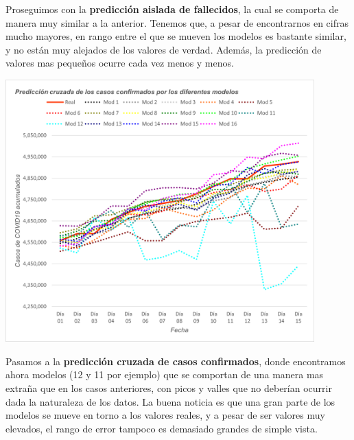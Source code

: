 \documentclass[12pt,a4paper, xcolor=table]{article}
\begin{document}
            Proseguimos con la \textbf{predicción aislada de fallecidos}, la cual se comporta de manera muy similar a la anterior. Tenemos que, a pesar de encontrarnos en cifras mucho mayores, en rango entre el que se mueven los modelos es bastante similar, y no están muy alejados de los valores de verdad. Además, la predicción de valores mas pequeños ocurre cada vez menos y menos. 
        
            \begin{center}
                \centering
                \includegraphics[width=450px]{img/pred_c_conf_BZ.png}
            \end{center}
            
            Pasamos a la \textbf{predicción cruzada de casos confirmados}, donde encontramos ahora modelos (12 y 11 por ejemplo) que se comportan de una manera mas extraña que en los casos anteriores, con picos y valles que no deberían ocurrir dada la naturaleza de los datos. La buena noticia es que una gran parte de los modelos se mueve en torno a los valores reales, y a pesar de ser valores muy elevados, el rango de error tampoco es demasiado grandes de simple vista.
            
\end{document}
